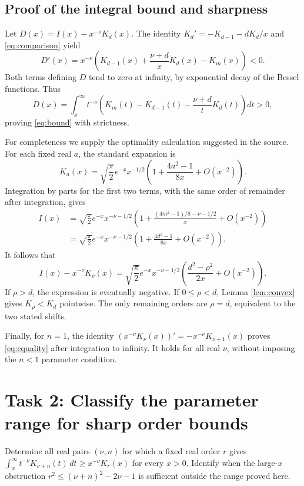 \documentclass[11pt]{article}
\begin{document}
\subsection*{Proof of the integral bound and sharpness}
Let $D(x)=I(x)-x^{-\nu}K_d(x)$. The identity
$K_d'=-K_{d-1}-dK_d/x$ and \eqref{eq:comparison} yield
\[
 D'(x)=x^{-\nu}\left(K_{d-1}(x)+\frac{\nu+d}{x}K_d(x)-K_m(x)\right)<0.
\]
Both terms defining $D$ tend to zero at infinity, by exponential decay
of the Bessel functions. Thus
\[
 D(x)=\int_x^\infty t^{-\nu}
 \left(K_m(t)-K_{d-1}(t)-\frac{\nu+d}{t}K_d(t)\right)dt>0,
\]
proving \eqref{eq:bound} with strictness.

For completeness we supply the optimality calculation suggested in the
source. For each fixed real $a$, the standard expansion is
\[
 K_a(x)=\sqrt{\frac\pi2}e^{-x}x^{-1/2}
 \left(1+\frac{4a^2-1}{8x}+O(x^{-2})\right).
\]
Integration by parts for the first two terms, with the same order of
remainder after integration, gives
\begin{align*}
 I(x)&=\sqrt{\frac\pi2}e^{-x}x^{-\nu-1/2}
 \left(1+\frac{(4m^2-1)/8-\nu-1/2}{x}+O(x^{-2})\right)\\
 &=\sqrt{\frac\pi2}e^{-x}x^{-\nu-1/2}
 \left(1+\frac{4d^2-1}{8x}+O(x^{-2})\right).
\end{align*}
It follows that
\begin{equation}\label{eq:sharp}
 I(x)-x^{-\nu}K_\rho(x)
 =\sqrt{\frac\pi2}e^{-x}x^{-\nu-1/2}
   \left(\frac{d^2-\rho^2}{2x}+O(x^{-2})\right).
\end{equation}
If $\rho>d$, the expression is eventually negative. If $0\leq\rho<d$,
Lemma \ref{lem:convex} gives $K_\rho<K_d$ pointwise. The only remaining
orders are $\rho=d$, equivalent to the two stated shifts.

Finally, for $n=1$, the identity
$(x^{-\nu}K_\nu(x))'=-x^{-\nu}K_{\nu+1}(x)$ proves
\eqref{eq:equality} after integration to infinity. It holds for all
real $\nu$, without imposing the $n<1$ parameter condition.

\section*{Task 2: Classify the parameter range for sharp order bounds}
Determine all real pairs $(\nu,n)$ for which a fixed real order $r$
gives $\int_x^\infty t^{-\nu}K_{\nu+n}(t)\,dt\geq x^{-\nu}K_r(x)$
for every $x>0$. Identify when the large-$x$ obstruction
$r^2\leq(\nu+n)^2-2\nu-1$ is sufficient outside the range proved here.
\end{document}
